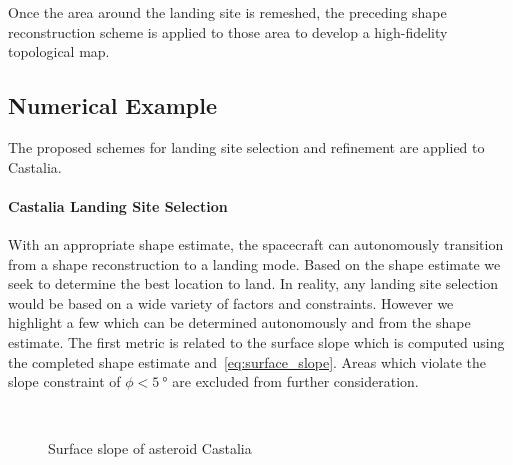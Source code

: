 \documentclass[smallextended]{svjour3}       %
\begin{document}
Once the area around the landing site is remeshed, the preceding shape reconstruction scheme is applied to those area to develop a high-fidelity topological map. 

\subsection{Numerical Example}

The proposed schemes for landing site selection and refinement are applied to Castalia.



\paragraph{Castalia Landing Site Selection}

With an appropriate shape estimate, the spacecraft can autonomously transition from a shape reconstruction to a landing mode.
Based on the shape estimate we seek to determine the best location to land. 
In reality, any landing site selection would be based on a wide variety of factors and constraints. 
However we highlight a few which can be determined autonomously and from the shape estimate.
The first metric is related to the surface slope which is computed using the completed shape estimate and~\cref{eq:surface_slope}.
Areas which violate the slope constraint of \( \phi < \SI{5}{\degree} \) are excluded from further consideration.
\begin{figure}[htbp]
    \centering
    \\
    \caption{Surface slope of asteroid Castalia\label{fig:surface_slope_castalia_both}}
\end{figure}
\end{document}
